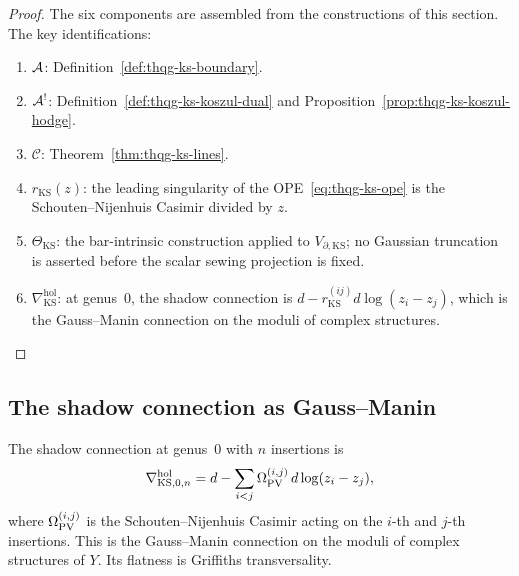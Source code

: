 \begin{proof}
The six components are assembled from the constructions of this
section. The key identifications:
\begin{enumerate}[label=(\roman*)]
\item $\mathcal{A}$: Definition~\ref{def:thqg-ks-boundary}.
\item $\mathcal{A}^!$: Definition~\ref{def:thqg-ks-koszul-dual} and
 Proposition~\ref{prop:thqg-ks-koszul-hodge}.
\item $\mathcal{C}$: Theorem~\ref{thm:thqg-ks-lines}.
\item $r_{\mathrm{KS}}(z)$: the leading singularity of the
 OPE~\eqref{eq:thqg-ks-ope} is the Schouten--Nijenhuis Casimir
 divided by $z$.
\item $\Theta_{\mathrm{KS}}$: the bar-intrinsic construction applied
 to $V_{\partial,\mathrm{KS}}$; no Gaussian truncation is asserted
 before the scalar sewing projection is fixed.
\item $\nabla^{\mathrm{hol}}_{\mathrm{KS}}$: at genus~$0$, the shadow
 connection is $d - r_{\mathrm{KS}}^{(ij)} d\log(z_i - z_j)$, which
 is the Gauss--Manin connection on the moduli of complex structures.
\end{enumerate}
\end{proof}


\subsection{The shadow connection as Gauss--Manin}

\begin{theorem}[Shadow connection = Gauss--Manin; \ClaimStatusProvedHere]
The shadow connection at genus~$0$ with $n$ insertions is
\begin{equation}%
\nabla^{\mathrm{hol}}_{\mathrm{KS},0,n}
= d - \sum_{i < j}
\Omega_{\PV}^{(i,j)}\, d\log(z_i - z_j),
\end{equation}
where $\Omega_{\operatorname{PV}}^{(i,j)}$ is the Schouten--Nijenhuis Casimir
acting on the $i$-th and $j$-th insertions. This is the
Gauss--Manin connection on the moduli of complex structures of $Y$.
Its flatness is Griffiths transversality.
\end{theorem}

